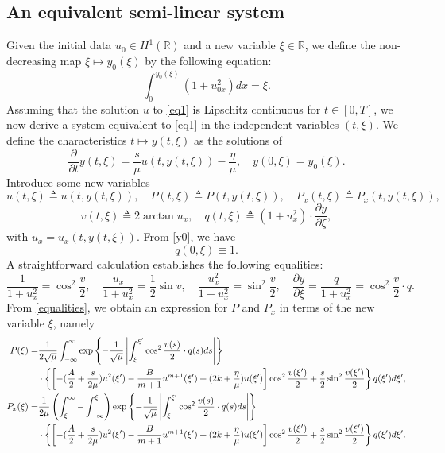 \documentclass[10pt]{article}
\numberwithin{equation}{section}
\begin{document}
	\subsection{An equivalent semi-linear system}\label{sec_equivalent}
	Given the initial data $u_0\in H^1(\mathbb{R})$ and a new variable $\xi\in\mathbb{R}$, we define the non-decreasing map $\xi\mapsto y_0(\xi)$ by the following equation:
	\begin{equation}\label{y0}
		\int_0^{y_0(\xi)}(1+u_{0x}^2)dx=\xi.
	\end{equation}
	Assuming that the solution $u$ to \eqref{eq1} is Lipschitz continuous for $t\in[0,T]$, we now derive a system equivalent to \eqref{eq1} in the independent variables $(t,\xi)$. We define the characteristics $t\mapsto y(t,\xi)$ as the solutions of
	\begin{equation}\label{y}
		\frac{\partial}{\partial t} y(t,\xi)=\frac{s}{\mu}u\left(t,y(t,\xi)\right)-\frac{\eta}{\mu}, \quad y(0,\xi)=y_0(\xi).
	\end{equation}
	Introduce some new variables
	\begin{equation*}
		u(t,\xi)\triangleq u\left(t,y(t,\xi)\right),\quad P(t,\xi)\triangleq P\left(t,y(t,\xi)\right),\quad P_x(t,\xi)\triangleq P_x\left(t,y(t,\xi)\right),
	\end{equation*}
	\begin{equation}\label{vq}
		v(t,\xi)\triangleq 2\arctan u_x,\quad q(t,\xi)\triangleq (1+u_x^2)\cdot\frac{\partial y}{\partial\xi},
	\end{equation}
	with $u_{x}=u_{x}(t,y(t,\xi))$. From \eqref{y0}, we have
	$$q(0,\xi)\equiv1.$$
	A straightforward calculation establishes the following equalities:
	\begin{equation}\label{equalities}
		\frac{1}{1+u_{x}^{2}}=\cos^{2}\frac{v}{2},\quad\frac{u_{x}}{1+u_{x}^{2}}=\frac{1}{2}\sin v,\quad\frac{u_{x}^{2}}{1+u_{x}^{2}}=\sin^{2}\frac{v}{2},\quad\frac{\partial y}{\partial\xi}=\frac{q}{1+u_{x}^{2}}=\cos^{2}\frac{v}{2}\cdot q.
	\end{equation}
	From \eqref{equalities}, we obtain an expression for $P$ and $P_x$ in terms of the new variable $\xi$, namely
	\begin{align}
		P(\xi) =&\frac{1}{2\sqrt{\mu}}\int_{-\infty}^{\infty}\exp\left\{-\frac{1}{\sqrt{\mu}}\left|\int_{\xi}^{\xi^{\prime}}\cos^{2}\frac{v(s)}{2}\cdot q(s)ds\right|\right\}\notag \\
		& \cdot\left\{\left[-(\frac{A}{2}+\frac{s}{2\mu})u^2(\xi^{\prime})-\frac{B}{m+1}u^{m+1}(\xi^{\prime})+(2k+\frac{\eta}{\mu})u(\xi^{\prime})\right]\cos^2\frac{v(\xi^{\prime})}{2}+\frac{s}{2}\sin^2\frac{v(\xi^{\prime})}{2}\right\}q(\xi^{\prime})d\xi^{\prime},\label{P}\\
		P_x(\xi) =&\frac{1}{2\mu}\left(\int_\xi^\infty-\int_{-\infty}^\xi\right)\exp\left\{-\frac{1}{\sqrt{\mu}}\left|\int_{\xi}^{\xi^{\prime}}\cos^{2}\frac{v(s)}{2}\cdot q(s)ds\right|\right\}\notag \\
		& \cdot\left\{\left[-(\frac{A}{2}+\frac{s}{2\mu})u^2(\xi^{\prime})-\frac{B}{m+1}u^{m+1}(\xi^{\prime})+(2k+\frac{\eta}{\mu})u(\xi^{\prime})\right]\cos^2\frac{v(\xi^{\prime})}{2}+\frac{s}{2}\sin^2\frac{v(\xi^{\prime})}{2}\right\}q(\xi^{\prime})d\xi^{\prime}.\label{Px}
	\end{align}
\end{document}
